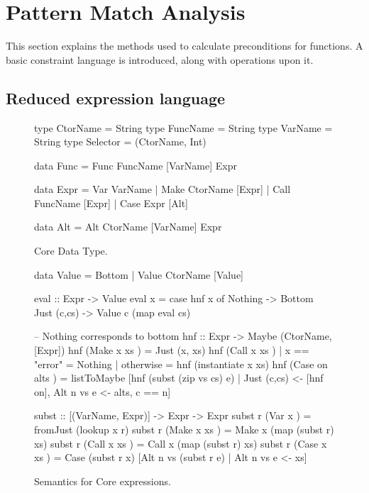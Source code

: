 \documentclass[preprint]{sigplanconf}
\begin{document}
\section{Pattern Match Analysis}
\label{sec:manipulate}

This section explains the methods used to calculate preconditions for functions. A basic constraint language is introduced, along with operations upon it.

\subsection{Reduced expression language}
\label{sec:core}

\begin{figure}
\begin{code}
type CtorName  =  String
type FuncName  =  String
type VarName   =  String
type Selector  =  (CtorName, Int)

data Func  =  Func FuncName [VarName] Expr

data Expr  =  Var   VarName
           |  Make  CtorName  [Expr]
           |  Call  FuncName  [Expr]
           |  Case  Expr      [Alt]

data Alt   =  Alt CtorName [VarName] Expr
\end{code}
\caption{Core Data Type.}
\label{fig:core}
\end{figure}

\begin{figure}
\begin{code}
data Value = Bottom | Value CtorName [Value]

eval :: Expr -> Value
eval x = case  hnf x of
               Nothing      -> Bottom
               Just (c,cs)  -> Value c (map eval cs)

-- Nothing corresponds to bottom
hnf :: Expr -> Maybe (CtorName, [Expr])
hnf (Make  x   xs    )  =  Just (x, xs)
hnf (Call  x   xs    )  |  x == "error"  = Nothing
                        |  otherwise     = hnf (instantiate x xs)
hnf (Case  on  alts  )  =  listToMaybe [hnf (subst (zip vs cs) e)
       | Just (c,cs) <- [hnf on], Alt n vs e <- alts, c == n]

subst :: [(VarName, Expr)] -> Expr -> Expr
subst r (Var   x     ) = fromJust (lookup x r)
subst r (Make  x xs  ) = Make  x (map (subst r) xs)
subst r (Call  x xs  ) = Call  x (map (subst r) xs)
subst r (Case  x xs  ) = Case (subst r x)
    [Alt n vs (subst r e) | Alt n vs e <- xs]
\end{code}
\caption{Semantics for Core expressions.}
\label{fig:semantics}
\end{figure}
\end{document}
